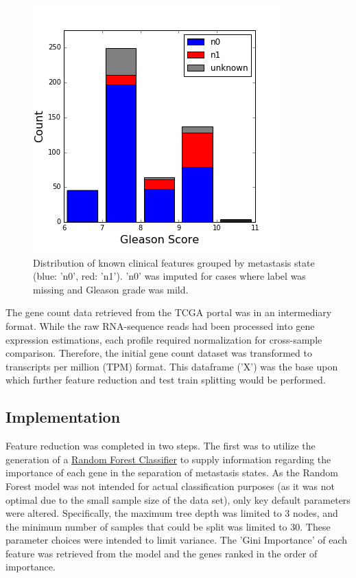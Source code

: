 \documentclass[final]{article}
\begin{document}
\begin{figure}
  \centering
  \includegraphics[scale=0.5]{GleasonHist2}
  \caption{Distribution of known clinical features grouped by metastasis state (blue: 'n0', red: 'n1').\label{fig:postGSHist}
  'n0' was imputed for cases where label was missing and Gleason grade was mild.}
\end{figure}

The gene count data retrieved from the TCGA portal was in an intermediary
format.  While the raw RNA-sequence reads had been processed into gene
expression estimations, each profile required normalization for
cross-sample comparison.   Therefore, the initial gene count dataset was transformed to
transcripts per million (TPM) format.  This dataframe ('X') was the base upon
which further feature reduction and test train splitting would be performed.

\subsection{Implementation}

Feature reduction was completed in two steps.  The first was to utilize the
generation of a
\href{http://scikit-learn.org/stable/modules/generated/sklearn.ensemble.RandomForestClassifier.html#sklearn.ensemble.RandomForestClassifier}{Random
Forest Classifier} to supply information regarding the importance of each gene
in the separation of metastasis states.  As the Random Forest model was not
intended for actual classification purposes (as it was not optimal due to the small sample
size of the data set), only key default parameters were altered. Specifically,
the maximum tree depth was limited to 3 nodes, and the minimum number of samples
that could be split was limited to 30.  These parameter choices were intended to
limit variance.  The 'Gini Importance' of each feature was retrieved from the
model and the genes ranked in the order of importance.
\end{document}
